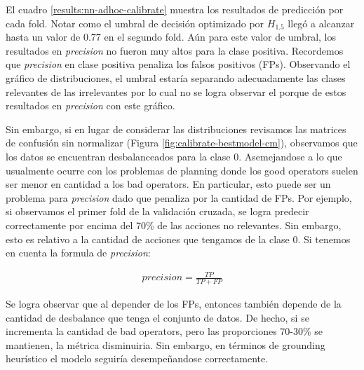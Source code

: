 El cuadro \ref{results:nn-adhoc-calibrate} muestra los resultados de predicción
por cada fold. Notar como el umbral de decisión optimizado por $H_{1.5}$ llegó a
alcanzar hasta un valor de 0.77 en el segundo fold. Aún para este valor de
umbral, los resultados en \emph{precision} no fueron muy altos para la clase
positiva. Recordemos que \emph{precision} en clase positiva penaliza los falsos
positivos (FPs). Observando el gráfico de distribuciones, el umbral estaría
separando adecuadamente las clases relevantes de las irrelevantes por lo cual no
se logra observar el porque de estos resultados en \emph{precision} con este
gráfico.

Sin embargo, si en lugar de considerar las distribuciones revisamos las matrices
de confusión sin normalizar (Figura \ref{fig:calibrate-bestmodel-cm}),
observamos que los datos se encuentran desbalanceados para la clase 0.
Asemejandose a lo que usualmente ocurre con los problemas de planning donde los
good operators suelen ser menor en cantidad a los bad operators. En particular,
esto puede ser un problema para \emph{precision} dado que penaliza por la
cantidad de FPs. Por ejemplo, si observamos el primer fold de la validación
cruzada, se logra predecir correctamente por encima del 70\% de las acciones no
relevantes. Sin embargo, esto es relativo a la cantidad de acciones que tengamos
de la clase 0. Si tenemos en cuenta la formula de \emph{precision}:

\begin{align*}
    precision = \frac{TP}{TP + FP}
\end{align*}

Se logra observar que al depender de los FPs, entonces también depende de la
cantidad de desbalance que tenga el conjunto de datos. De hecho, si se
incrementa la cantidad de bad operators, pero las proporciones 70-30\% se
mantienen, la métrica disminuiria. Sin embargo, en términos de grounding
heurístico el modelo seguiría desempeñandose correctamente.

